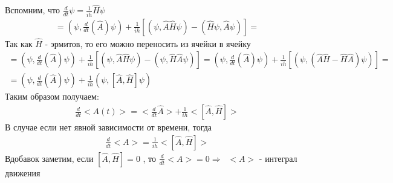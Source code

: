 Вспомним, что  $\frac{d}{dt}\psi = \frac{1}{ih}\widehat{H}\psi$
\begin{gather*}
	= \left(\psi,\frac{d}{dt}(\hat{A})\psi\right)+\frac{1}{ih}\left[(\psi,\widehat{A}\widehat{H}\psi) - (\widehat{H}\psi,\widehat{A}\psi)\right] = 
\end{gather*}
Так как $\widehat{H}$ - эрмитов, то его можно переносить из ячейки в ячейку
\begin{gather*}
	= \left(\psi,\frac{d}{dt}(\hat{A})\psi\right)+\frac{1}{ih}\left[(\psi,\widehat{A}\widehat{H}\psi) - (\psi,\widehat{H}\widehat{A}\psi)\right] = \left(\psi,\frac{d}{dt}(\hat{A})\psi\right)+\frac{1}{ih}\left[(\psi,(\hat{A}\hat{H}-\hat{H}\hat{A})\psi)\right] =\\ = \left(\psi,\frac{d}{dt}(\hat{A})\psi\right)+\frac{1}{ih}(\psi,[\hat{A},\hat{H}]\psi)
\end{gather*}
Таким образом получаем:
\begin{gather*}
	\frac{d}{dt}<A(t)> = <\frac{d}{dt}\hat{A}>+\frac{1}{ih}<[\hat{A},\hat{H}]>
\end{gather*}
В случае если нет явной зависимости от времени, тогда
\begin{gather*}
	\frac{d}{dt}<A>=\frac{1}{ih}<[\hat{A},\hat{H}]>
\end{gather*}
Вдобавок заметим, если $[\hat{A},\hat{H}] = 0$ , то $\frac{d}{dt}<A> = 0 \Rightarrow \;\;<A>$ - интеграл движения
